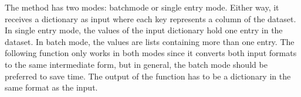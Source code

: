\documentclass[letterpaper,10pt,english]{jupyterBook}
\begin{document}
\sphinxAtStartPar
The \sphinxhyphen{}method has two modes: batch\sphinxhyphen{}mode or single entry mode. Either way, it receives a dictionary as input where each key represents a column of the dataset.
In single entry mode, the values of the input dictionary hold one entry in the dataset.
In batch mode, the values are lists containing more than one entry.
The following function only works in both modes since it converts both input formats to the same intermediate form, but in general, the batch mode should be preferred to save time.
The output of the function has to be a dictionary in the same format as the input.
\begin{sphinxVerbatimInput}

\begin{sphinxVerbatim}[commandchars=\\\{\}]
   
     


\end{sphinxVerbatim}
\end{sphinxVerbatimInput}
\end{document}
